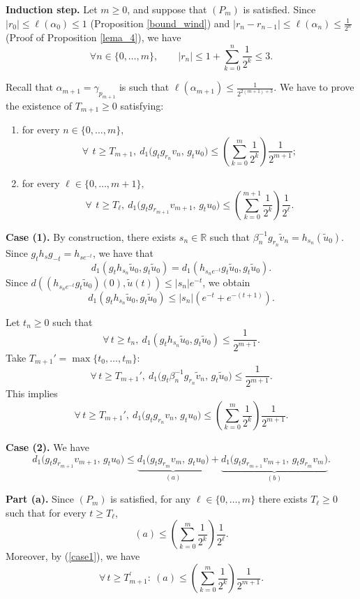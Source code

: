 \documentclass[a4paper,english,reqno]{amsart}
\newcommand{\R}{\mathbb{R}}
\theoremstyle{definition}
\numberwithin{equation}{section}
\begin{document}
\medskip
\noindent\textbf{Induction step.}
Let $m\geq0$, and suppose that $(P_m)$ is satisfied.
Since $|r_0|\le \ell(\alpha_0)\le 1$ (Proposition \ref{bound_wind}) and
$|r_n-r_{n-1}|\le \ell(\alpha_n)\le \frac{1}{2^{n}}$ (Proof of Proposition \ref{lema_4}), we have
\[
\forall n\in\{0,\dots,m\},\qquad
|r_n|\le 1+\sum_{k=0}^{n}\frac{1}{2^{k}}\le 3.
\]

\medskip
Recall that $\alpha_{m+1}=\gamma_{p_{m+1}}$ is such that $\ell(\alpha_{m+1})\le \frac{1}{2^{2(m+1)+3}}$. We have to prove the existence of	
$T_{m+1}\ge 0$ satisfying:
\begin{enumerate}
	\item for every $n\in\{0,\dots,m\},$ 
	\[\forall \, ~ t\ge T_{m+1},~
	d_1\bigl(g_t g_{r_{n}}v_n,\, g_tu_0\bigr)
	\le \left(\sum_{k=0}^{m}\frac{1}{2^{k}}\right)\frac{1}{2^{m+1}};
	\]
	\item for every $\ell\in\{0,\dots,m+1\},$ 
	\[\forall \, ~ t\ge T_{\ell},~
	d_1\bigl(g_t g_{r_{m+1}}v_{m+1},\, g_tu_0\bigr)
	\le \left(\sum_{k=0}^{m+1}\frac{1}{2^{k}}\right)\frac{1}{2^{\ell}} .
	\]
\end{enumerate}

\medskip
\noindent\textbf{Case (1).}
By construction, there exists $s_n\in \R$ such that $\beta_n^{-1}g_{r_n}\tilde v_n= h_{s_n}(\tilde u_0)$.
Since $g_th_sg_{-t}=h_{se^{-t}}$, we have that
$$
d_1(g_th_{s_n}\tilde u_0,g_t\tilde u_0)=d_1(h_{s_ne^{-t}}g_t\tilde u_0,g_t\tilde u_0).
$$
Since $d((h_{s_ne^{-t}}g_t\tilde u_0)(0),\tilde u(t))\leq |s_n|e^{-t}$, we obtain
$$d_1(g_th_{s_n}\tilde u_0 ,g_t \tilde u_0)\leq |s_n|(e^{-t}+e^{-(t+1)}).$$

Let $t_n\geq 0$ such that
$$
\forall\, t\geq t_n, ~d_1(g_th_{s_n}\tilde u_0,g_t\tilde u_0)\leq \frac{1}{2^{m+1}}.
$$
Take $T_{m+1}'=\max\{t_0,\dots,t_m\}$: 	
\[\forall \, t\ge T_{m+1}', ~
d_1\bigl(g_t\beta_n^{-1}g_{r_n}\tilde v_n,\, g_t\tilde u_0\bigr)
\le \frac{1}{2^{m+1}}.
\]
This implies
\begin{equation}\label{case1}
	\forall \, t\ge T_{m+1}', ~
	d_1\bigl(g_t g_{r_n} v_n,\, g_t u_0\bigr)
	\le \left(\sum_{k=0}^{m}\frac{1}{2^{k}}\right)\frac{1}{2^{m+1}}.
\end{equation}

\medskip
\noindent\textbf{Case (2).}
We have
\[
d_1\bigl(g_t g_{r_{m+1}} v_{m+1},\, g_t u_0\bigr)
\le
\underbrace{d_1\bigl(g_t g_{r_{m}} v_{m},\, g_t u_0\bigr)}_{(a)}
+
\underbrace{d_1\bigl(g_t g_{r_{m+1}} v_{m+1},\, g_t g_{r_{m}} v_{m}\bigr)}_{(b)}.
\]

\medskip
\noindent\textbf{Part (a).}
Since $(P_m)$ is satisfied, for any $\ell\in\{0,\dots,m\}$ there exists $T_\ell\ge 0$ such that for every $t\ge T_\ell$,
\[
(a)\le \left(\sum_{k=0}^{m}\frac{1}{2^{k}}\right)\frac{1}{2^{\ell}} .
\]
Moreover, by (\ref{case1}), we have
\[ \forall\, t\ge T_{m+1}^{'}:~
(a)\le \left(\sum_{k=0}^{m}\frac{1}{2^{k}}\right)\frac{1}{2^{m+1}}.
\]
\end{document}
